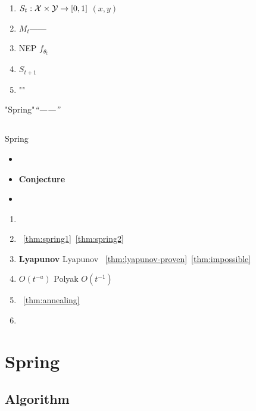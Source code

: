 \begin{enumerate}[nosep]
    \item \textbf{} $S_t: \mathcal{X} \times \mathcal{Y} \to [0,1]$  $(x, y)$ 
    \item \textbf{} $M_t$\textit{}——
    \item \textbf{}NEP $f_{\theta_t}$ 
    \item \textbf{} $S_{t+1}$
    \item \textbf{}""
\end{enumerate}

"Spring"\textit{``——''}

\subsection{}

 Spring 
\begin{itemize}[nosep]
    \item \textbf{}
    \item \textbf{Conjecture}
    \item \textbf{}
\end{itemize}


\begin{enumerate}[nosep]
    \item \textbf{}
    \item \textbf{}~\ref{thm:spring1}~\ref{thm:spring2}
    \item \textbf{ Lyapunov } Lyapunov ~\ref{thm:lyapunov-proven}~\ref{thm:impossible}
    \item \textbf{} $O(t^{-a})$ Polyak  $O(t^{-1})$
    \item \textbf{}~\ref{thm:annealing}
    \item \textbf{}
\end{enumerate}

\section{Spring }

\subsection{Algorithm}

